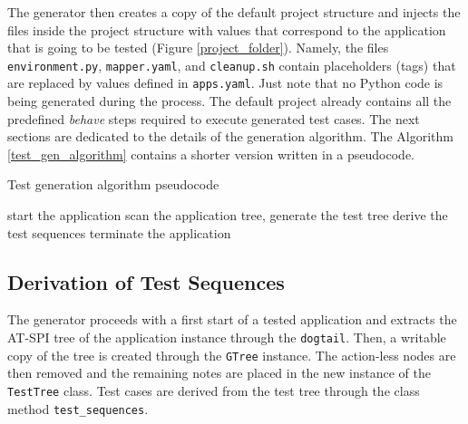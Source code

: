 The generator then creates a copy of the default project structure and injects the files inside the project structure with values that correspond to the application that is going to be tested (Figure \ref{project_folder}). Namely, the files \texttt{environment.py}, \texttt{mapper.yaml}, and \texttt{cleanup.sh} contain placeholders (tags) that are replaced by values defined in \texttt{apps.yaml}. Just note that no Python code is being generated during the process. The default project already contains all the predefined \textit{behave} steps required to execute generated test cases.
The next sections are dedicated to the details of the generation algorithm. The Algorithm \ref{test_gen_algorithm} contains a shorter version written in a pseudocode. 

\begin{center}
\begin{algorithm}[H]
\caption{Test generation algorithm pseudocode}
\label{test_gen_algorithm}
\SetAlgoLined
{}
 start the application\;
 scan the application tree, generate the test tree\;
 derive the test sequences\;
 terminate the application\;
\end{algorithm}
\end{center}

\subsection{Derivation of Test Sequences}

The generator proceeds with a first start of a tested application and extracts the AT-SPI tree of the application instance through the \texttt{dogtail}. Then, a writable copy of the tree is created through the \texttt{GTree} instance. The action-less nodes are then removed and the remaining notes are placed in the new instance of the \texttt{TestTree} class. Test cases are derived from the test tree through the class method \texttt{test\_sequences}. 

